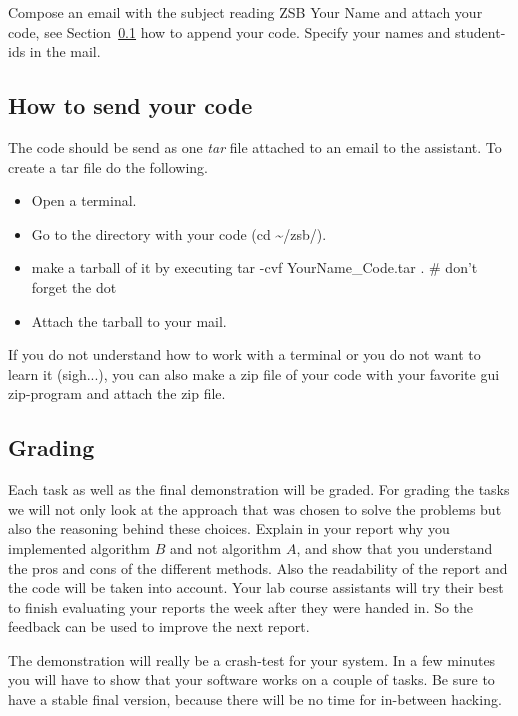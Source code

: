 \documentclass[10pt]{scrartcl}
\begin{document}
Compose an email with the subject reading {\ttfamily\small ZSB Your
Name} and attach your code, see Section~\ref{subsec:Howtosendcode} how to append
your code. Specify your names and student-ids in the mail.


\subsection{How to send your code}
\label{subsec:Howtosendcode}
The code should be send as one {\em tar} file attached to an email to the assistant. To create a tar file do the following.
\begin{itemize}
  \item Open a terminal.
  \item Go to the directory with your code ({\ttfamily\small cd \~{}/zsb/}).
  \item make a tarball of it by executing {\ttfamily\small tar -cvf YourName\_Code.tar .} \# don't forget the dot
  \item Attach the tarball to your mail.
\end{itemize}
If you do not understand how to work with a terminal or you do not want
to learn it (sigh...), you can also make a zip file of your code with
your favorite gui zip-program and attach the zip file.

\subsection{Grading}
Each task as well as the final demonstration will be graded. 
For grading the tasks we will not only look at the approach that was
chosen to solve the problems but also the reasoning behind these
choices. Explain in your report why you implemented algorithm
$B$ and not algorithm $A$, and show that you understand the pros and
cons of the different methods. 
Also the readability of the report and the code will be taken into
account.
Your lab course assistants will try their best to finish evaluating your
reports the week after they were handed in. So the feedback can be used
to improve the next report.

The demonstration will really be a crash-test for your system. In a few
minutes you will have to show that your software works on a couple of
tasks. Be sure to have a stable final version, because there will be no
time for in-between hacking.
\end{document}
